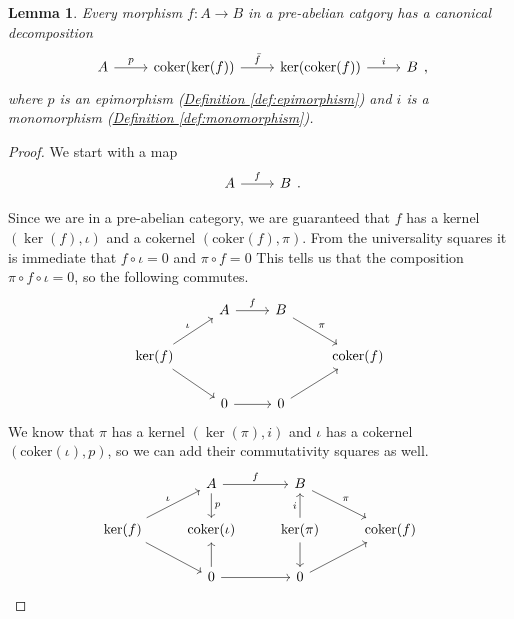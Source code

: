 \documentclass[a4paper,10pt]{scrreprt}
\newcommand{\coker}{\mathrm{coker}}
\theoremstyle{definition}
\theoremstyle{plain}
\newtheorem{lemma}{Lemma}[section]
\theoremstyle{remark}
\begin{document}
\begin{lemma}
  \label{lemma:everymorphisminapreabeliancategoryfactors}
  Every morphism $f\colon A \to B$ in a pre-abelian catgory has a canonical decomposition
  \begin{equation*}
    \begin{tikzcd}
      A 
      \arrow[r, "p"]
      & \coker(\ker(f))
      \arrow[r, "\bar{f}"]
      & \ker(\coker(f))
      \arrow[r, "i"]
      & B
    \end{tikzcd},
  \end{equation*}
  where $p$ is an epimorphism (\hyperref[def:epimorphism]{Definition \ref*{def:epimorphism}}) and $i$ is a monomorphism (\hyperref[def:monomorphism]{Definition \ref*{def:monomorphism}}).
\end{lemma}
\begin{proof}
  We start with a map
  \begin{equation*}
    \begin{tikzcd}
      A 
      \arrow[r, "f"]
      & B
    \end{tikzcd}.
  \end{equation*}

  Since we are in a pre-abelian category, we are guaranteed that $f$ has a kernel $(\ker(f), \iota)$ and a cokernel $(\coker(f), \pi)$. From the universality squares it is immediate that $f \circ \iota = 0$ and $\pi \circ f = 0$ This tells us that the composition $\pi \circ f \circ \iota = 0$, so the following commutes.
  \begin{equation*}
    \begin{tikzcd}
      & A
      \arrow[r, "f"]
      & B
      \arrow[dr, "\pi"]
      \\
      \ker(f)
      \arrow[ur, "\iota"]
      \arrow[dr]
      & & & \coker(f)
      \\
      & 0
      \arrow[r]
      & 0
      \arrow[ur]
    \end{tikzcd}
  \end{equation*}
  We know that $\pi$ has a kernel $(\ker(\pi), i)$ and $\iota$ has a cokernel $(\coker(\iota), p)$, so we can add their commutativity squares as well.
  \begin{equation*}
    \begin{tikzcd}
      & A
      \arrow[r, "f"]
      \arrow[d, "p"]
      & B
      \arrow[dr, "\pi"]
      \\
      \ker(f)
      \arrow[ur, "\iota"]
      \arrow[dr]
      & \coker(\iota)
      & \ker(\pi)
      \arrow[u, "i"]
      \arrow[d]
      & \coker(f)
      \\
      & 0
      \arrow[u]
      \arrow[r]
      & 0
      \arrow[ur]
    \end{tikzcd}
  \end{equation*}


\end{proof}
\end{document}
